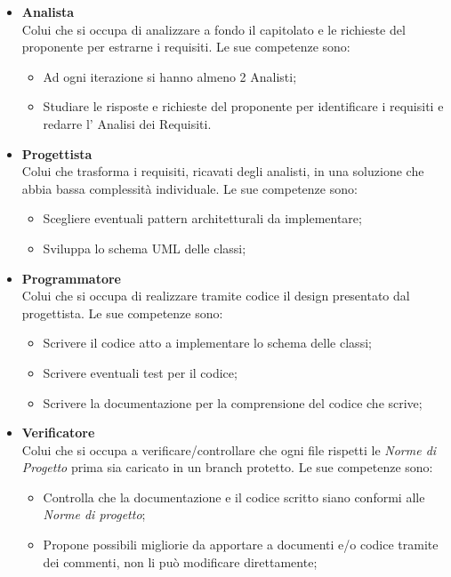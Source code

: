 \begin{itemize}
                    \item \textbf{Analista}\\
                    Colui che si occupa di analizzare a fondo il capitolato e le richieste del proponente per estrarne i requisiti.
                    Le sue competenze sono:
                    \begin{itemize}
                        \item Ad ogni iterazione si hanno almeno 2 Analisti;
                        \item Studiare le risposte e richieste del proponente per identificare i requisiti e redarre l' Analisi dei Requisiti.
                    \end{itemize}
                    \item \textbf{Progettista}\\
                    Colui che trasforma i requisiti, ricavati degli analisti, in una soluzione che abbia bassa complessità individuale.
                    Le sue competenze sono:
                    \begin{itemize}
                        \item Scegliere eventuali pattern architetturali da implementare;
                        \item Sviluppa lo schema UML delle classi;
                    \end{itemize}
                    \item \textbf{Programmatore}\\
                    Colui che si occupa di realizzare tramite codice il design presentato dal progettista.
                    Le sue competenze sono:
                    \begin{itemize}
                        \item Scrivere il codice atto a implementare lo schema delle classi;
                        \item Scrivere eventuali test per il codice;
                        \item Scrivere la documentazione per la comprensione del codice che scrive;
                    \end{itemize}
                    \item \textbf{Verificatore}\\
                    Colui che si occupa a verificare/controllare che ogni file rispetti le \textit{Norme di Progetto} prima sia caricato in un branch protetto.
                    Le sue competenze sono:
                    \begin{itemize}
                        \item Controlla che la documentazione e il codice scritto siano conformi alle \textit{Norme di progetto};
                        \item Propone possibili migliorie da apportare a documenti e/o codice tramite dei commenti, non li può modificare direttamente;
                    \end{itemize}
            \end{itemize}

